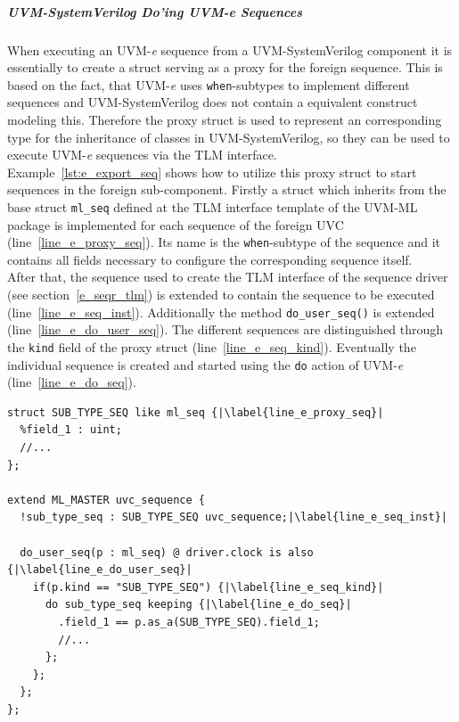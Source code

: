\subparagraph{UVM-SystemVerilog Do'ing UVM-\textit{e} Sequences}
When executing an UVM-\textit{e} sequence from a UVM-SystemVerilog component it is essentially to create a struct serving as a proxy for the foreign sequence. This is based on the fact, that UVM-\textit{e} uses \lstinline$when$-subtypes to implement different sequences and UVM-SystemVerilog does not contain a equivalent construct modeling this. Therefore the proxy struct is used to represent an corresponding type for the inheritance of classes in UVM-SystemVerilog, so they can be used to execute UVM-\textit{e} sequences via the TLM interface.\\
Example~\ref{lst:e_export_seq} shows how to utilize this proxy struct to start sequences in the foreign sub-component. Firstly a struct which inherits from the base struct \lstinline$ml_seq$ defined at the TLM interface template of the UVM-ML package is implemented for each sequence of the foreign UVC (line~\ref{line_e_proxy_seq}). Its name is the \lstinline$when$-subtype of the sequence and it contains all fields necessary to configure the corresponding sequence itself.\\
After that, the sequence used to create the TLM interface of the sequence driver (see section~\ref{e_seqr_tlm}) is extended to contain the sequence to be executed (line~\ref{line_e_seq_inst}). Additionally the method \lstinline$do_user_seq()$ is extended (line~\ref{line_e_do_user_seq}). The different sequences are distinguished through the \lstinline$kind$ field of the proxy struct (line~\ref{line_e_seq_kind}). Eventually the individual sequence is created and started using the \lstinline$do$ action of UVM-\textit{e} (line~\ref{line_e_do_seq}).
\lstset{language=e, numbers = left, escapechar=|, breaklines=true}
\begin{lstlisting}[frame=htrbl, caption={\textit{e}: executing the sequence received from the proxy sequencer},
label={lst:e_export_seq}]
struct SUB_TYPE_SEQ like ml_seq {|\label{line_e_proxy_seq}|
  %field_1 : uint;
  //...
};

extend ML_MASTER uvc_sequence {
  !sub_type_seq : SUB_TYPE_SEQ uvc_sequence;|\label{line_e_seq_inst}|

  do_user_seq(p : ml_seq) @ driver.clock is also {|\label{line_e_do_user_seq}|
    if(p.kind == "SUB_TYPE_SEQ") {|\label{line_e_seq_kind}|
      do sub_type_seq keeping {|\label{line_e_do_seq}|
        .field_1 == p.as_a(SUB_TYPE_SEQ).field_1;
        //...
      };
    };
  };
};
\end{lstlisting}

